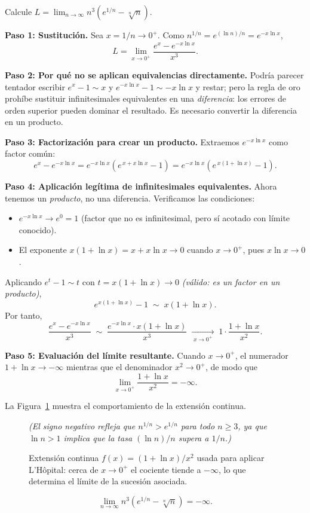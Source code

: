 \begin{example}
Calcule $\displaystyle L = \lim_{n\to\infty} n^3\!\left(e^{1/n}-\sqrt[n]{n}\right)$.

\begin{myproof}
\textbf{Paso 1: Sustitución.}
Sea $x = 1/n \to 0^+$. Como $n^{1/n} = e^{(\ln n)/n} = e^{-x\ln x}$,
\[
  L = \lim_{x\to 0^+} \frac{e^x - e^{-x\ln x}}{x^3}.
\]

\textbf{Paso 2: Por qué no se aplican equivalencias directamente.}
Podría parecer tentador escribir $e^x - 1 \sim x$ y
$e^{-x\ln x} - 1 \sim {-x\ln x}$ y restar; pero la regla de oro
prohíbe sustituir infinitesimales equivalentes en una \emph{diferencia}:
los errores de orden superior pueden dominar el resultado.
Es necesario convertir la diferencia en un producto.

\textbf{Paso 3: Factorización para crear un producto.}
Extraemos $e^{-x\ln x}$ como factor común:
\[
  e^x - e^{-x\ln x}
  = e^{-x\ln x}\!\left(e^{\,x + x\ln x} - 1\right)
  = e^{-x\ln x}\!\left(e^{\,x(1+\ln x)} - 1\right).
\]

\textbf{Paso 4: Aplicación legítima de infinitesimales equivalentes.}
Ahora tenemos un \emph{producto}, no una diferencia. Verificamos las
condiciones:
\begin{itemize}
  \item $e^{-x\ln x} \to e^0 = 1$ (factor que no es infinitesimal,
        pero sí acotado con límite conocido).
  \item El exponente $x(1+\ln x) = x + x\ln x \to 0$ cuando
        $x\to 0^+$, pues $x\ln x \to 0$.
\end{itemize}
Aplicando $e^t - 1 \sim t$ con $t = x(1+\ln x) \to 0$
\emph{(válido: es un factor en un producto)},
\[
  e^{x(1+\ln x)} - 1 \;\sim\; x(1+\ln x).
\]
Por tanto,
\[
  \frac{e^x - e^{-x\ln x}}{x^3}
  \;\sim\;
  \frac{e^{-x\ln x}\cdot x(1+\ln x)}{x^3}
  \;\xrightarrow[\;x\to 0^+\;]{}\;
  1\cdot\frac{1+\ln x}{x^2}.
\]

\textbf{Paso 5: Evaluación del límite resultante.}
Cuando $x \to 0^+$, el numerador $1 + \ln x \to -\infty$ mientras
que el denominador $x^2 \to 0^+$, de modo que
\[
  \lim_{x\to 0^+}\frac{1+\ln x}{x^2} = -\infty.
\]

La Figura~\ref{fig:limite_lhopital_continuo} muestra el comportamiento de la extensión continua.

\begin{figure}[H]
\centering
  \textit{(El signo negativo refleja que $n^{1/n} > e^{1/n}$ para
  todo $n \geq 3$, ya que $\ln n > 1$ implica que la tasa
  $(\ln n)/n$ supera a $1/n$.)}
\caption{Extensión continua $f(x)=(1+\ln x)/x^2$ usada para aplicar L'Hôpital: cerca de $x\to 0^+$ el cociente tiende a $-\infty$, lo que determina el límite de la sucesión asociada.}
\label{fig:limite_lhopital_continuo}
\end{figure}
\[
  \lim_{n\to\infty} n^3\!\left(e^{1/n} - \sqrt[n]{n}\right)
  = \boxed{-\infty.}
\]
\end{myproof}
\end{example}


